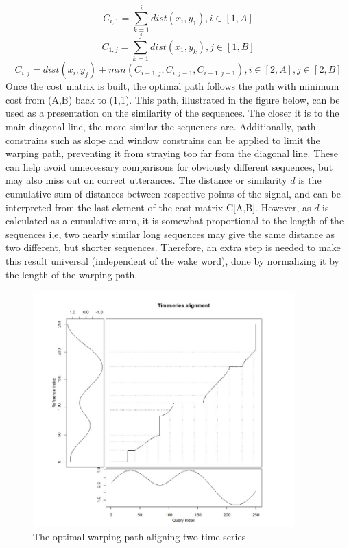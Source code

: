     \begin{equation}
         C_{i,1} = \sum_{k=1}^i dist(x_i,y_1), i \in [1,A] 
    \end{equation}
     \begin{equation}
        C_{1,j} = \sum_{k=1}^j dist(x_1,y_k)  , j \in [1,B]
    \end{equation}
    \begin{equation}
        C_{i,j} = dist(x_i , y_j) + min(C_{i-1,j} , C_{i,j-1} , C_{i-1,j-1} ) , i \in [2,A] , j \in [2,B] 
    \end{equation}
    Once the cost matrix is built, the optimal path follows the path with minimum cost from (A,B) back to (1,1). This path, illustrated in the figure below, can be used as a presentation on the similarity of the sequences. The closer it is to the main diagonal line, the more similar the sequences are. Additionally, path constrains\cite{DTW} such as slope and window constrains can be applied to limit the warping path, preventing it from straying too far from the diagonal line. These can help avoid unnecessary comparisons for obviously different sequences, but may also miss out on correct utterances. The distance or similarity $d$ is the cumulative sum of distances between respective points of the signal, and can be interpreted from the last element of the cost matrix C[A,B]. However, as $d$ is calculated as a cumulative sum, it is somewhat proportional to the length of the sequences i,e, two nearly similar long sequences may give the same distance as two different, but shorter sequences. Therefore, an extra step is needed to make this result universal (independent of the wake word), done by normalizing it by the length of the warping path.
    
    
    \begin{figure}[h]
        \centering
        \includegraphics[width = 0.9\textwidth]{img/The-optimal-warping-path-aligning-time-series-from-the-Figure-1.jpg}
        \caption{The optimal warping path aligning two time series\cite{DTW}}
        \label{figdtwpath}
    \end{figure}
    
